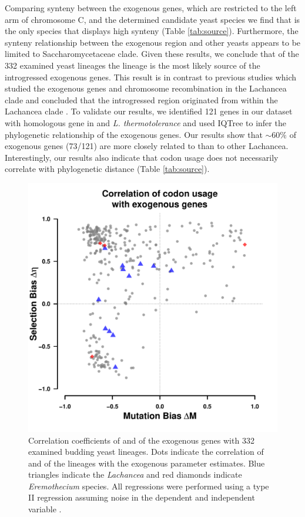 \documentclass[fleqn,letterpaper]{article}
\begin{document}
Comparing synteny between the exogenous genes, which are restricted to the left arm of chromosome C, and the determined candidate yeast species we find that \gossypii is the only species that displays high synteny (Table \ref{tab:source}).
Furthermore, the synteny relationship between the exogenous region and other yeasts appears to be limited to Saccharomycetaceae clade.
Given these results, we conclude that of the 332 examined yeast lineages the \gossypii lineage is the most likely source of the introgressed exogenous genes.
This result is in contrast to previous studies which studied the exogenous genes and chromosome recombination in the Lachancea clade and concluded that the introgressed region originated from within the Lachancea clade \citep{payen2009, friedrich2015, vakirlis2016}.
To validate our results, we identified 121 genes in our dataset \citep{shen2018} with homologous gene in \gossypii and \textit{L. thermotolerance} and used IQTree \citep{nguyen2015} to infer the phylogenetic relationship of the exogenous genes. Our results show that $\sim 60 \%$ of exogenous genes (73/121) are more closely related to \gossypii than to other Lachancea.
Interestingly, our results also indicate that codon usage does not necessarily correlate with phylogenetic distance (Table \ref{tab:source}). 

\begin{figure}
     \centering
	\includegraphics[width=.45\textwidth]{img/csp_mean_correlation_exo.pdf}
	\caption{Correlation coefficients of \DM and \DE of the exogenous genes with 332 examined budding yeast lineages. 
	Dots indicate the correlation of \DM and \DE of the lineages with the exogenous parameter estimates.
	Blue triangles indicate the \textit{Lachancea} and red diamonds indicate \textit{Eremothecium} species.
	All regressions were performed using a type II regression assuming noise in the dependent and independent variable \citep{SokalAndRohlf1981}.}
	\label{fig:csp_exo_comp}
\end{figure}
\end{document}
